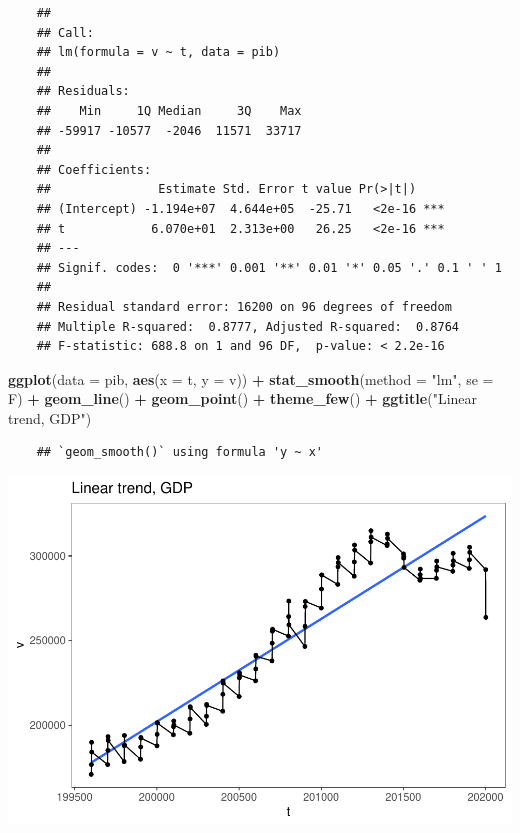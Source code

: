 \documentclass[11pt, a4paper]{report}
\newenvironment{Shaded}{\begin{snugshade}}{\end{snugshade}}
\newcommand{\DataTypeTok}[1]{\textcolor[rgb]{0.13,0.29,0.53}{#1}}
\newcommand{\KeywordTok}[1]{\textcolor[rgb]{0.13,0.29,0.53}{\textbf{#1}}}
\newcommand{\NormalTok}[1]{#1}
\newcommand{\OperatorTok}[1]{\textcolor[rgb]{0.81,0.36,0.00}{\textbf{#1}}}
\newcommand{\StringTok}[1]{\textcolor[rgb]{0.31,0.60,0.02}{#1}}
\theoremstyle{plain}
\theoremstyle{plain}
\theoremstyle{remark}
\begin{document}
\begin{verbatim}
	## 
	## Call:
	## lm(formula = v ~ t, data = pib)
	## 
	## Residuals:
	##    Min     1Q Median     3Q    Max 
	## -59917 -10577  -2046  11571  33717 
	## 
	## Coefficients:
	##               Estimate Std. Error t value Pr(>|t|)    
	## (Intercept) -1.194e+07  4.644e+05  -25.71   <2e-16 ***
	## t            6.070e+01  2.313e+00   26.25   <2e-16 ***
	## ---
	## Signif. codes:  0 '***' 0.001 '**' 0.01 '*' 0.05 '.' 0.1 ' ' 1
	## 
	## Residual standard error: 16200 on 96 degrees of freedom
	## Multiple R-squared:  0.8777, Adjusted R-squared:  0.8764 
	## F-statistic: 688.8 on 1 and 96 DF,  p-value: < 2.2e-16
\end{verbatim}

\begin{Shaded}
	\begin{Highlighting}[]
		\KeywordTok{ggplot}\NormalTok{(}\DataTypeTok{data =}\NormalTok{ pib, }\KeywordTok{aes}\NormalTok{(}\DataTypeTok{x =}\NormalTok{ t, }\DataTypeTok{y =}\NormalTok{ v)) }\OperatorTok{+}\StringTok{ }\KeywordTok{stat_smooth}\NormalTok{(}\DataTypeTok{method =} \StringTok{"lm"}\NormalTok{, }
		\DataTypeTok{se =}\NormalTok{ F) }\OperatorTok{+}\StringTok{ }\KeywordTok{geom_line}\NormalTok{() }\OperatorTok{+}\StringTok{ }\KeywordTok{geom_point}\NormalTok{() }\OperatorTok{+}\StringTok{ }\KeywordTok{theme_few}\NormalTok{() }\OperatorTok{+}\StringTok{ }\KeywordTok{ggtitle}\NormalTok{(}\StringTok{"Linear trend, GDP"}\NormalTok{)}
	\end{Highlighting}
\end{Shaded}

\begin{verbatim}
	## `geom_smooth()` using formula 'y ~ x'
\end{verbatim}

\begin{center}\includegraphics{Econo2_P5_files/figure-latex/parametric linear-1} \end{center}
\end{document}
